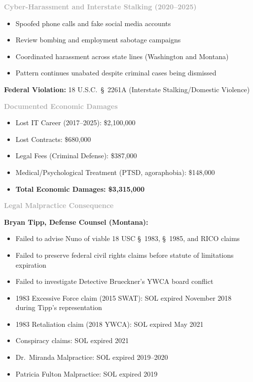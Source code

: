 \documentclass[11pt, letterpaper]{article}
\newcommand{\subsubsectiontitle}[1]{\vspace{0.1in}\noindent\textcolor{DarkGray}{\textbf{#1}}\vspace{0.05in}}
\begin{document}
\subsubsectiontitle{Cyber-Harassment and Interstate Stalking (2020--2025)}
\begin{itemize}[leftmargin=*,itemsep=2pt]
    \item Spoofed phone calls and fake social media accounts
    \item Review bombing and employment sabotage campaigns
    \item Coordinated harassment across state lines (Washington and Montana)
    \item Pattern continues unabated despite criminal cases being dismissed
\end{itemize}

\textbf{Federal Violation:} 18 U.S.C.\ \S\ 2261A (Interstate Stalking/Domestic Violence)

\subsubsectiontitle{Documented Economic Damages}
\begin{itemize}[leftmargin=*,itemsep=2pt]
    \item Lost IT Career (2017--2025): \$2,100,000
    \item Lost Contracts: \$680,000
    \item Legal Fees (Criminal Defense): \$387,000
    \item Medical/Psychological Treatment (PTSD, agoraphobia): \$148,000
    \item \textbf{Total Economic Damages: \$3,315,000}
\end{itemize}

\subsubsectiontitle{Legal Malpractice Consequence}

\textbf{Bryan Tipp, Defense Counsel (Montana):}
\begin{itemize}[leftmargin=*,itemsep=2pt]
    \item Failed to advise Nuno of viable 18 USC \S\ 1983, \S\ 1985, and RICO claims
    \item Failed to preserve federal civil rights claims before statute of limitations expiration
    \item Failed to investigate Detective Brueckner's YWCA board conflict
    \item 1983 Excessive Force claim (2015 SWAT): SOL expired November 2018 during Tipp's representation
    \item 1983 Retaliation claim (2018 YWCA): SOL expired May 2021
    \item Conspiracy claims: SOL expired 2021
    \item Dr.\ Miranda Malpractice: SOL expired 2019--2020
    \item Patricia Fulton Malpractice: SOL expired 2019
\end{itemize}
\end{document}
